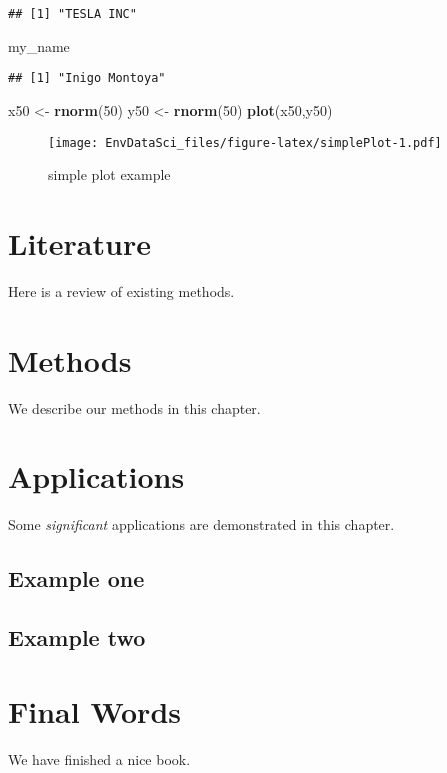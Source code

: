 \documentclass[
]{book}
\newenvironment{Shaded}{\begin{snugshade}}{\end{snugshade}}
\newcommand{\DecValTok}[1]{\textcolor[rgb]{0.00,0.00,0.81}{#1}}
\newcommand{\KeywordTok}[1]{\textcolor[rgb]{0.13,0.29,0.53}{\textbf{#1}}}
\newcommand{\NormalTok}[1]{#1}
\newcommand{\StringTok}[1]{\textcolor[rgb]{0.31,0.60,0.02}{#1}}
\begin{document}
\begin{verbatim}
## [1] "TESLA INC"
\end{verbatim}

\begin{Shaded}
\begin{Highlighting}[]
\NormalTok{my_name}
\end{Highlighting}
\end{Shaded}

\begin{verbatim}
## [1] "Inigo Montoya"
\end{verbatim}

\begin{Shaded}
\begin{Highlighting}[]
\NormalTok{x50 <-}\StringTok{ }\KeywordTok{rnorm}\NormalTok{(}\DecValTok{50}\NormalTok{)}
\NormalTok{y50 <-}\StringTok{ }\KeywordTok{rnorm}\NormalTok{(}\DecValTok{50}\NormalTok{)}
\KeywordTok{plot}\NormalTok{(x50,y50)}
\end{Highlighting}
\end{Shaded}

\begin{figure}
\centering
\texttt{[image: EnvDataSci\_files/figure-latex/simplePlot-1.pdf]}
\caption{\label{fig:simplePlot}simple plot example}
\end{figure}

\hypertarget{literature}{%
\chapter{Literature}\label{literature}}

Here is a review of existing methods.

\hypertarget{methods}{%
\chapter{Methods}\label{methods}}

We describe our methods in this chapter.

\hypertarget{applications}{%
\chapter{Applications}\label{applications}}

Some \emph{significant} applications are demonstrated in this chapter.

\hypertarget{example-one}{%
\section{Example one}\label{example-one}}

\hypertarget{example-two}{%
\section{Example two}\label{example-two}}

\hypertarget{final-words}{%
\chapter{Final Words}\label{final-words}}

We have finished a nice book.

  
\end{document}
